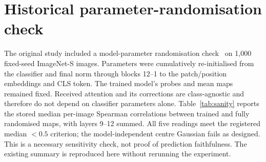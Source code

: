 \section{Historical parameter-randomisation check}
\label{app:sanity}

The original study included a model-parameter randomisation check~\citep{adebayo2018} on 1,000 fixed-seed ImageNet-S images. Parameters were cumulatively re-initialised from the classifier and final norm through blocks 12--1 to the patch/position embeddings and CLS token. The trained model's probes and mean maps remained fixed. Received attention and its corrections are class-agnostic and therefore do not depend on classifier parameters alone. Table~\ref{tab:sanity} reports the stored median per-image Spearman correlations between trained and fully randomised maps, with layers 9--12 summed. All five readings meet the registered median $<0.5$ criterion; the model-independent centre Gaussian fails as designed. This is a necessary sensitivity check, not proof of prediction faithfulness. The existing summary is reproduced here without rerunning the experiment.

\begin{table}[!htbp]
\caption{Stored model-randomisation results: median map correlation after full randomisation. The five readings pass the registered $<0.5$ criterion in every model.}
\label{tab:sanity}
\centering\small

\end{table}
